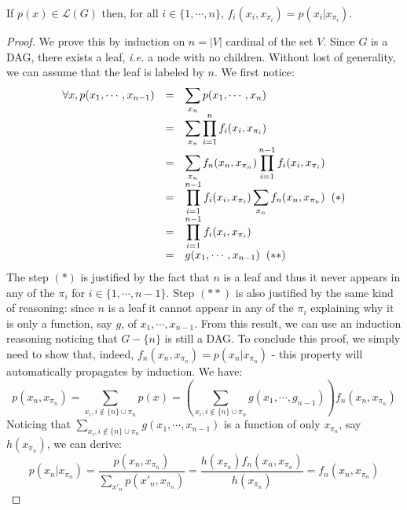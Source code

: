 \documentclass[12pt]{report}
\begin{document}
\begin{proposition}
If $p(x)\in\mathcal{L}(G)$ then, for all $i\in\{1,\cdots,n\}$, $f_i(x_i, x_{\pi_i}) = p(x_i | x_{\pi_i})$.
\end{proposition}
\begin{proof}
We prove this by induction on $n = |V|$ cardinal of the set $V$. Since $G$ is a DAG, there exists a leaf, \emph{i.e.} a node with no children. Without lost of generality, we can assume that the leaf is labeled by $n$. We first notice: 
\begin{equation}
\begin{array}{r l l}
	\forall x, p(x_1, \cdots, x_{n-1}) & = & \displaystyle\sum_{x_n} p(x_1, \cdots, x_n) \\
																		 & = & \displaystyle\sum_{x_n} \prod_{i=1}^{n} f_i(x_i,x_{\pi_i}) \\
																		 & = & \displaystyle\sum_{x_n} f_n(x_n, x_{\pi_n})\prod_{i=1}^{n-1} f_i(x_i,x_{\pi_i}) \\
																		 & = & \displaystyle\prod_{i=1}^{n-1} f_i(x_i,x_{\pi_i}) \sum_{x_n} f_n(x_n, x_{\pi_n}) \hspace{0.2cm} (*)  \\
																		 & = & \displaystyle\prod_{i=1}^{n-1} f_i(x_i,x_{\pi_i}) \\
																		 & = & \displaystyle g(x_1, \cdots, x_{n-1}) \hspace{0.2cm} (**)
\end{array}
\label{eq:}
\end{equation}
The step $(*)$ is justified by the fact that $n$ is a leaf and thus it never appears in any of the $\pi_i$ for $i\in\{1,\cdots,n-1\}$. Step $(**)$ is also justified by the same kind of reasoning: since $n$ is a leaf it cannot appear in any of the $\pi_i$ explaining why it is only a function, say $g$, of $x_1,\cdots, x_{n-1}$. From this result, we can use an induction reasoning noticing that $G - \{n\}$ is still a DAG. To conclude this proof, we simply need to show that, indeed, $f_n(x_n, x_{\pi_n}) = p(x_n | x_{\pi_n})$ - this property will automatically propagates by induction. We have: 
\begin{equation}
p(x_n, x_{\pi_n}) = \sum_{x_i, i\notin \{n\}\cup \pi_n} p(x) = \left( \sum_{x_i, i\notin \{n\}\cup \pi_n} g(x_1, \cdots, g_{n-1})\right)f_n(x_n, x_{\pi_n})
\label{eq:}
\end{equation}
Noticing that $\sum_{x_i, i\notin \{n\}\cup \pi_n} g(x_1, \cdots, x_{n-1})$ is a function of only $x_{\pi_n}$, say $h(x_{\pi_n})$, we can derive: 
\begin{equation}
p(x_n | x_{\pi_n}) = \frac{p(x_n, x_{\pi_n})}{\sum_{x'_n}p(x'_n, x_{\pi_n})} = \frac{h(x_{\pi_n}) f_n(x_n, x_{\pi_n})}{h(x_{\pi_n})} = f_n(x_n, x_{\pi_n})
\label{eq:}
\end{equation}
\end{proof}
\end{document}
